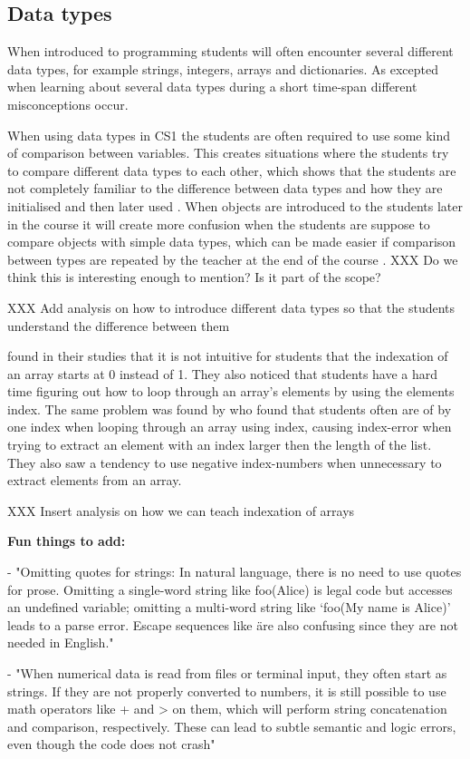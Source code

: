 \subsection{Data types}

When introduced to programming students will often encounter several different data types, for example strings, integers, arrays and dictionaries. As excepted when learning about several data types during a short time-span different misconceptions occur. 

When using data types in CS1 the students are often required to use some kind of comparison between variables. This creates situations where the students try to compare different data types to each other, which shows that the students are not completely familiar to the difference between data types and how they are initialised and then later used \parencite{Kurvinen2016}. When objects are introduced to the students later in the course it will create more confusion when the students are suppose to compare objects with simple data types, which can be made easier if comparison between types are repeated by the teacher at the end of the course \parencite{Kurvinen2016}. XXX Do we think this is interesting enough to mention? Is it part of the scope?

XXX Add analysis on how to introduce different data types so that the students understand the difference between them


 \textcite{Kurvinen2016} found in their studies that it is not intuitive for students that the indexation of an array starts at 0 instead of 1. They also noticed that students have a hard time figuring out how to loop through an array's elements by using the elements index. The same problem was found by \textcite{KumarVeerasamy2016} who found that students often are of by one index when looping through an array using index, causing index-error when trying to extract an element with an index larger then the length of the list. They also saw a tendency to use negative index-numbers when unnecessary to extract elements from an array.

 XXX Insert analysis on how we can teach indexation of arrays


\textbf{Fun things to add:}

- "Omitting quotes for strings: In natural language, there is no need to use quotes for prose. Omitting a single-word string like foo(Alice) is legal code but accesses an undefined variable; omitting a multi-word string like ‘foo(My name is Alice)’ leads to a parse error. Escape sequences like \" are also confusing since they are not needed in English." \parencite{GuoMarkelZhang2020}

- "When numerical data is read from files or terminal input, they often start as strings. If they are not properly converted to numbers, it is still possible to use math operators like + and > on them, which will perform string concatenation and comparison, respectively. These can lead to subtle semantic and logic errors, even though the code does not crash" \parencite{GuoMarkelZhang2020}